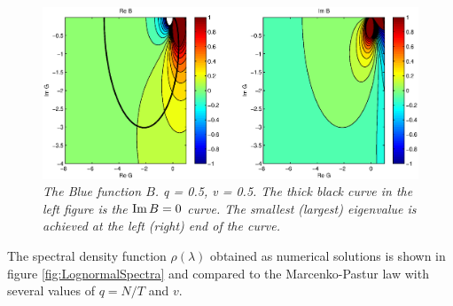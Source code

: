\documentclass{article}
\begin{document}
\begin{figure}[htb!]
  \centering
    \includegraphics[scale=0.45, clip=true, trim=66 0 64
    0]{../pics/LognormalBlue.eps}
  \caption{\small \it The Blue function $B$. q = 0.5, v = 0.5. The
    thick black curve in the left figure is the $\text{Im}\, B = 0$ curve. The
    smallest (largest) eigenvalue is achieved at the left (right) end
    of the curve.}
  \label{fig:LognormalBlue}
\end{figure}
The spectral density function $\rho(\lambda)$ obtained as numerical
solutions is shown in figure \ref{fig:LognormalSpectra} and compared
to the Marcenko-Pastur law with several values of $q = N/T$ and $v$.
\end{document}
